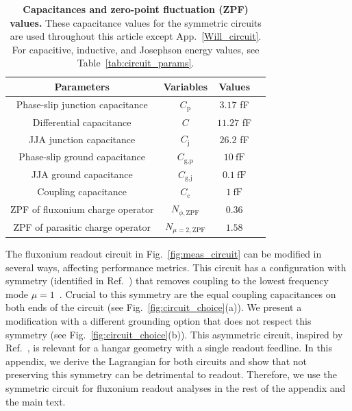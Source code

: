 \documentclass[%
reprint,
superscriptaddress,
 amsmath,amssymb,
 aps,
 prx,
longbibliography,
floatfix,
]{revtex4-2}
\begin{document}
\begin{table}[htb]
    \begin{center}
    \begin{tabular}{|c |c| c |c| }
     \hline
     \textbf{Parameters} & \textbf{Variables} & \textbf{Values}\\ 
    \hline
    Phase-slip junction capacitance &$C_\textrm{p}$ &$3.17$ fF\\ 
    \hline
    Differential capacitance &$C$ &$11.27$ fF\\ 
    \hline
    JJA junction capacitance &$C_\textrm{j}$&$26.2$ fF\\ 
    \hline
    Phase-slip ground capacitance&$C_\textrm{g,p}$&$10 \ \mathrm{fF}$\\ 
    \hline
    JJA ground capacitance&$C_\textrm{g,j}$&$0.1 \ \mathrm{fF}$\\ 
    \hline
    Coupling capacitance&$C_\textrm{c}$ &$1 \ \mathrm{fF}$\\ 
     \hline
      ZPF of fluxonium charge operator&$N_{\phi,\mathrm{ZPF}}$&$0.36$\\
     \hline
      ZPF of parasitic charge operator&$N_{\mu=2,\mathrm{ZPF}}$&$1.58$\\
     \hline
    \end{tabular}
    \end{center}
    
    \caption{{\bf Capacitances and zero-point fluctuation (ZPF) values.} These capacitance values for the symmetric circuits are used throughout this article except App.~\ref{Will_circuit}. For capacitive, inductive, and Josephson energy values, see Table~\ref{tab:circuit_params}.}
    \label{tab:params}
    \end{table}

The fluxonium readout circuit in Fig.~\ref{fig:meas_circuit} can be modified in several ways, affecting performance metrics. This circuit has a configuration with symmetry (identified in Ref.~\cite{ferguson2013symmetries}) that removes coupling to the lowest frequency mode $\mu=1$~\cite{viola2015collective}. Crucial to this symmetry are the equal coupling capacitances on both ends of the circuit (see Fig.~\ref{fig:circuit_choice}(a)). We present a modification with a different grounding option that does not respect this symmetry (see Fig.~\ref{fig:circuit_choice}(b)). This asymmetric circuit, inspired by Ref.~\cite{zhang_universal_2021}, is relevant for a hangar geometry with a single readout feedline. In this appendix, we derive the Lagrangian for both circuits and show that not preserving this symmetry can be detrimental to readout. Therefore, we use the symmetric circuit for fluxonium readout analyses in the rest of the appendix and the main text.
\end{document}
